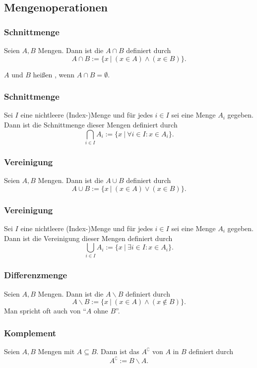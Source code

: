\subsection{Mengenoperationen}
%
\begin{frame}\frametitle{Schnittmenge}
	
	Seien $A,B$ Mengen. Dann ist die  $A\cap B$ definiert durch
	$$
		A\cap B := \big\{ x ~|~ (x\in A) \land (x\in B) \big\}.
	$$
	
	\pause
	\vspace{5mm}
	$A$ und $B$ hei{\ss}en , wenn $A\cap B = \emptyset$.
	
\end{frame}
%
%
\begin{frame}\frametitle{Schnittmenge}
	
	Sei $I$ eine nichtleere (Index-)Menge und für jedes $i\in I$ sei eine Menge $A_i$ gegeben. \\
	Dann ist die Schnittmenge dieser Mengen definiert durch	
	$$
		\bigcap_{i\in I} A_i := \big\{ x ~|~  \forall i \in I: x \in A_i \big\}.
	$$
	
\end{frame}
%
%
\begin{frame}\frametitle{Vereinigung}

	Seien $A,B$ Mengen. Dann ist die  $A\cup B$ definiert durch
	$$
		A\cup B := \big\{ x ~|~ (x\in A) \lor (x\in B) \big\}.
	$$
	
\end{frame}
%
%
\begin{frame}\frametitle{Vereinigung}
	
	Sei $I$ eine nichtleere (Index-)Menge und für jedes $i\in I$ sei eine Menge $A_i$ gegeben. \\
	Dann ist die Vereinigung dieser Mengen definiert durch	
	$$
		\bigcup_{i\in I} A_i := \big\{ x ~|~  \exists i \in I: x \in A_i \big\}.
	$$
	
\end{frame}
%
%
\begin{frame}\frametitle{Differenzmenge}

	Seien $A,B$ Mengen. Dann ist die  $A\backslash B$ definiert durch
	$$
		A\backslash B := \big\{ x ~|~ (x\in A) \land (x\notin B) \big\}.
	$$
	\vfill
	Man spricht oft auch von ``$A$ ohne $B$''.
\end{frame}
%
%
\begin{frame}\frametitle{Komplement}
	
	Seien $A,B$ Mengen mit $A\subseteq B$. Dann ist das  $A^{\complement}$ von $A$ in $B$ definiert durch
	$$
		A^\complement := B \backslash A.
	$$
	
\end{frame}

